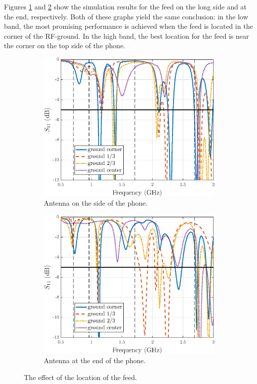 Figures \ref{fig:feed_pos_side_res} and \ref{fig:feed_pos_top_res} show the simulation results for the feed on the long side and at the end, respectively. Both of these graphs yield the same conclusion: in the low band, the most promising performance is achieved when the feed is located in the corner of the RF-ground. In the high band, the best location for the feed is near the corner on the top side of the phone.

\begin{figure}[H]
    \centering
    \begin{subfigure}[b]{0.49\textwidth}
        \includegraphics[width=\textwidth]{img/feed_pos_side_res.eps}
        \caption{Antenna on the side of the phone.}
        \label{fig:feed_pos_side_res}
    \end{subfigure}
    \begin{subfigure}[b]{0.49\textwidth}
        \includegraphics[width=\textwidth]{img/feed_pos_top_res.eps}
        \caption{Antenna at the end of the phone.}
        \label{fig:feed_pos_top_res}
    \end{subfigure}
    \caption{The effect of the location of the feed.}
    \label{fig:feed_effect}
\end{figure}

